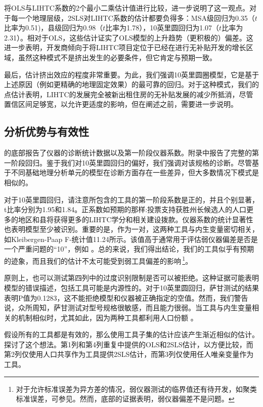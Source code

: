 \documentclass[lang=cn,11pt,a4paper]{paper}
\begin{document}
将OLS与LIHTC系数的2个最小二乘估计值进行比较，进一步说明了这一观点。对于每一个地理层级，2SLS对LIHTC系数的估计都要负得多：MSA级回归为0.35（$t$比率为0.51)，县级回归为0.98（$t$比率为1.78），10英里圆回归为1.07（$t$比率为2.31）。相对于OLS，这些估计证实了OLS模型的上升趋势（更积极的）偏差。这进一步表明，开发商倾向于将LIHTC项目定位于已经在进行无补贴开发的增长区域，虽然这种模式不是挤出发生的必要条件，但它肯定与预期一致。

最后，估计挤出效应的程度非常重要。为此，我们强调10英里圆圈模型，它是基于上述原因（例如更精确的地理固定效果）的最可靠的回归。对于这种模式，我们的点估计表明，LIHTC的发展完全被新出租住房的无补贴发展的减少所抵消，尽管置信区间足够宽，以允许更适度的影响，但在阐述之前，需要进一步说明。

\subsection{分析优势与有效性}

的底部报告了仪器的诊断统计数据以及第一阶段仪器系数。附录中报告了完整的第一阶段回归。鉴于我们对10英里圆回归的偏好，我们强调对该规格的诊断。尽管基于不同基础地理分析单元的模型在诊断方面存在一些差异，但大多数情况下模式是相似的。

对于10英里圆回归，请注意所包含的工具的第一阶段系数是正的，并且个别显著，t比率分别为1.95和1.84。正系数如预期的那样:投票支持获胜州长候选人的人口更多的地区和县将获得更多的LIHTC学分和相关建设拨款。仪器系数的统计显著性也表明模型至少被识别。重要的是，作为一对，这两种工具与内生变量密切相关，如Kleibergen-Paap F-统计值11.24所示。该值高于通常用于评估弱仪器偏差是否是一个严重问题的“10”，例如 \cite{Stock200580}。总的来说，我们得出结论，我们的工具似乎有预期的迹象，而且我们的估计不太可能受到弱工具偏差的影响\,\footnote{对于允许标准误差为异方差的情况，弱仪器测试的临界值还有待开发，如聚类标准误差，可参见\cite{Stock200580}。然而，底部的证据表明，弱仪器偏差不是问题。}。

原则上，也可以测试第四列中的过度识别限制是否可以被拒绝。这种证据可能表明模型的错误描述，包括工具可能是内源性的。对于10英里圆回归，萨甘测试的结果表明P值为0.1283，这不能拒绝模型和仪器被正确指定的空值。然而，我们警告说，众所周知，萨甘测试对型号规格很敏感，而且能力很弱。当工具与内生变量相关的机制相似时，尤其如此，因为两种工具都利用人口份额 \citep{Cameron2006,Murray2006111}。

假设所有的工具都是有效的，那么使用工具子集的估计应该产生渐近相似的估计。探讨了这个想法。第1列和第4列重复中提供的OLS和2SLS估计，以方便比较，而第2列仅使用人口共享作为工具提供2SLS估计，而第3列仅使用任人唯亲变量作为工具。
\end{document}
